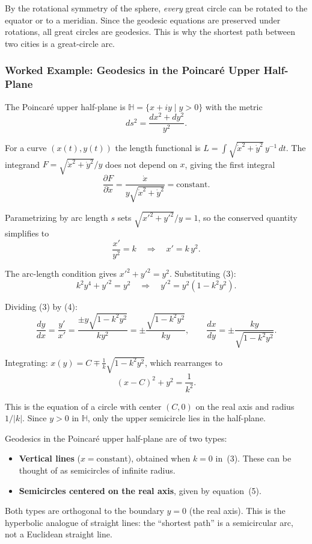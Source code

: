 By the rotational symmetry of the sphere, \emph{every} great circle can be rotated to the equator or to a meridian. Since the geodesic equations are preserved under rotations, all great circles are geodesics. This is why the shortest path between two cities is a great-circle arc.

\subsubsection*{Worked Example: Geodesics in the Poincar\'e Upper Half-Plane}

The Poincar\'e upper half-plane is $\mathbb{H} = \{x + iy \mid y > 0\}$ with the metric
\[
ds^2 = \frac{dx^2 + dy^2}{y^2}.
\]

For a curve $(x(t),y(t))$ the length functional is $L = \int \sqrt{\dot x^2 + \dot y^2}\,y^{-1}\,dt$. The integrand $F = \sqrt{\dot x^2 + \dot y^2}/y$ does not depend on $x$, giving the first integral
\[
\frac{\partial F}{\partial\dot x}
= \frac{\dot x}{y\sqrt{\dot x^2 + \dot y^2}}
= \text{constant}.
\]

Parametrizing by arc length $s$ sets $\sqrt{x'^2 + y'^2}/y = 1$, so the conserved quantity simplifies to
\[
\frac{x'}{y^2} = k \quad\Longrightarrow\quad x' = k\,y^2.
\tag{3}
\]

The arc-length condition gives $x'^2 + y'^2 = y^2$. Substituting (3):
\[
k^2 y^4 + y'^2 = y^2 \quad\Longrightarrow\quad y'^2 = y^2(1 - k^2 y^2).
\tag{4}
\]

Dividing (3) by (4):
\[
\frac{dy}{dx} = \frac{y'}{x'} = \frac{\pm y\sqrt{1 - k^2 y^2}}{k y^2}
= \pm \frac{\sqrt{1 - k^2 y^2}}{k y},
\qquad
\frac{dx}{dy} = \pm \frac{k y}{\sqrt{1 - k^2 y^2}}.
\]

Integrating: $x(y) = C \mp \frac{1}{k}\sqrt{1 - k^2 y^2}$, which rearranges to
\[
(x - C)^2 + y^2 = \frac{1}{k^2}.
\tag{5}
\]

This is the equation of a circle with center $(C,0)$ on the real axis and radius $1/|k|$. Since $y > 0$ in $\mathbb{H}$, only the upper semicircle lies in the half-plane.

\begin{example}
Geodesics in the Poincar\'e upper half-plane are of two types:
\begin{itemize}
    \item \textbf{Vertical lines} ($x = \text{constant}$), obtained when $k = 0$ in~(3). These can be thought of as semicircles of infinite radius.
    \item \textbf{Semicircles centered on the real axis}, given by equation~(5).
\end{itemize}
Both types are orthogonal to the boundary $y = 0$ (the real axis). This is the hyperbolic analogue of straight lines: the ``shortest path'' is a semicircular arc, not a Euclidean straight line.
\end{example}

